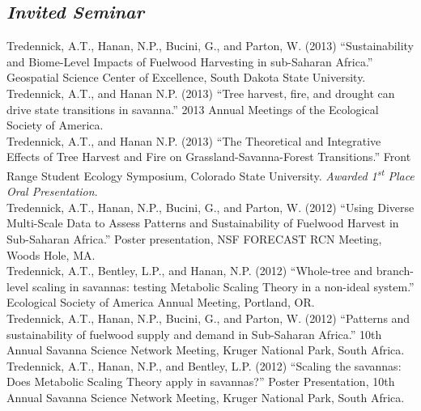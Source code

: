 \documentclass[margin,line]{resume}
\begin{document}
\begin{resume}
\section{\footnotesize{\emph{\textsf{Invited Seminar}} }}
    Tredennick, A.T., Hanan, N.P., Bucini, G., and Parton, W. (2013) ``Sustainability and Biome-Level Impacts of Fuelwood Harvesting in sub-Saharan Africa.'' Geospatial Science Center of Excellence, South Dakota State University. \vspace{-6mm}\\%
    
    Tredennick, A.T., and Hanan N.P. (2013) ``Tree harvest, fire, and drought can drive state transitions in savanna.'' 2013 Annual Meetings of the Ecological Society of America. \vspace{-6mm}\\%
    
    Tredennick, A.T., and Hanan N.P. (2013) ``The Theoretical and Integrative Effects of Tree Harvest and Fire on Grassland-Savanna-Forest Transitions.'' Front Range Student Ecology Symposium, Colorado State University. \textsl{Awarded 1\textsuperscript{st} Place Oral Presentation}. \vspace{-6mm}\\%
    
    Tredennick, A.T., Hanan, N.P., Bucini, G., and Parton, W. (2012) ``Using Diverse Multi-Scale Data to Assess Patterns and Sustainability of Fuelwood Harvest in Sub-Saharan Africa.'' Poster presentation, NSF FORECAST RCN Meeting, Woods Hole, MA. \vspace{-6mm}\\%
    
    Tredennick, A.T., Bentley, L.P., and Hanan, N.P. (2012) ``Whole-tree and branch-level scaling in savannas: testing Metabolic Scaling Theory in a non-ideal system.'' Ecological Society of America Annual Meeting, Portland, OR. \vspace{-6mm}\\%
    
    Tredennick, A.T., Hanan, N.P., Bucini, G., and Parton, W. (2012) ``Patterns and sustainability of fuelwood supply and demand in Sub-Saharan Africa.'' 10th Annual Savanna Science Network Meeting, Kruger National Park, South Africa.\vspace{-6mm}\\%
    
    Tredennick, A.T., Hanan, N.P., and Bentley, L.P. (2012) ``Scaling the savannas: Does Metabolic Scaling Theory apply in savannas?'' Poster Presentation, 10th Annual Savanna Science Network Meeting, Kruger National Park, South Africa. \vspace{-6mm}\\%


\end{resume}
\end{document}
